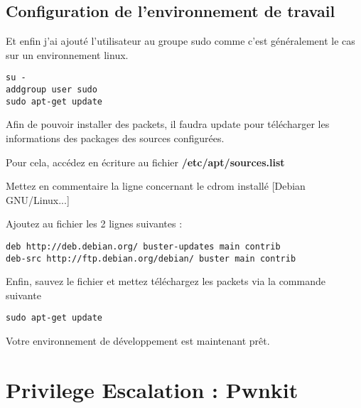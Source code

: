 \documentclass[a4paper, 12pt]{article}
\begin{document}
\begin{flushleft}
       \subsection{Configuration de l'environnement de travail}
       \item Et enfin j'ai ajouté l'utilisateur au groupe sudo comme c'est généralement le cas sur un environnement linux.
       \begin{lstlisting}
su -
addgroup user sudo
sudo apt-get update
       \end{lstlisting}
       \item Afin de pouvoir installer des packets, il faudra update pour télécharger les informations des packages des sources configurées.
       \item Pour cela, accédez en écriture au fichier \textbf{/etc/apt/sources.list}
       \item Mettez en commentaire la ligne concernant le cdrom installé [Debian GNU/Linux...]
       \item Ajoutez au fichier les 2 lignes suivantes : 
       \begin{lstlisting}
deb http://deb.debian.org/ buster-updates main contrib
deb-src http://ftp.debian.org/debian/ buster main contrib
       \end{lstlisting}
    \item Enfin, sauvez le fichier et mettez téléchargez les packets via la commande suivante
    \begin{lstlisting}
sudo apt-get update
    \end{lstlisting}
    \item Votre environnement de développement est maintenant prêt.
   \end{flushleft}

   \section{Privilege Escalation : Pwnkit}   		
\end{document}
